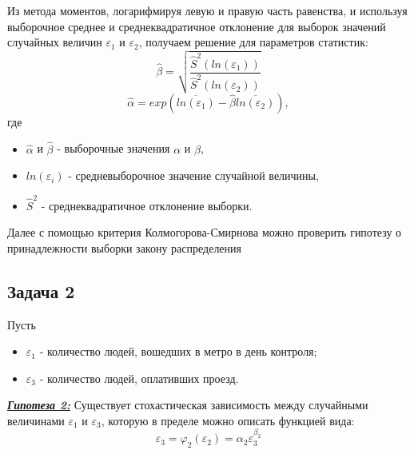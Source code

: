 \documentclass[a4paper, 12pt]{article}   	%
\begin{document}
    Из метода моментов, логарифмируя левую и правую часть равенства, и используя выборочное среднее и среднеквадратичное отклонение для выборок значений случайных величин $\varepsilon_1$ и $\varepsilon_2$, получаем решение для параметров статистик:
    \begin{equation}
        \hat{\beta} = \sqrt{\frac{ \hat{S}^2(ln (\varepsilon_1))}{\hat{S}^2 (ln(\varepsilon_2))}}
    \end{equation}
    \begin{equation}
        \hat{\alpha} = exp (\overline{ln (\varepsilon_1)} - \hat{\beta} \overline{ln (\varepsilon_2)}),
    \end{equation}
    где 
    \begin{itemize}
        \item $\hat{\alpha}$ и $\hat{\beta}$ - выборочные значения $\alpha$ и $\beta$,
        \item $ln (\varepsilon_i)$ - средневыборочное значение случайной величины,
        \item $\hat{S}^2$ - среднеквадратичное отклонение выборки.
    \end{itemize}
    
    Далее с помощью критерия Колмогорова-Смирнова можно проверить гипотезу о принадлежности выборки закону распределения 

\subsection{Задача 2}
    Пусть 
    \begin{itemize}
        \item $\varepsilon_1$ - количество людей, вошедших в метро в день контроля;
        \item $\varepsilon_3$ - количество людей, оплативших проезд.
    \end{itemize}
    
    \textit{\textbf{\underline{Гипотеза 2:}}} Существует стохастическая зависимость между случайными величинами $\varepsilon_1$ и $\varepsilon_3$, которую в пределе можно описать функцией вида: 
    \begin{equation}
        \varepsilon_3 = \varphi_2(\varepsilon_2) = \alpha_2 \varepsilon_3^{\beta_2}
    \end{equation}
\end{document}
